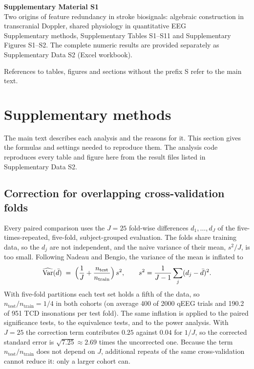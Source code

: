 \documentclass[10pt,a4paper]{article}
\begin{document}
\begin{center}
{\large\bfseries Supplementary Material S1}\\[6pt]
{\normalsize Two origins of feature redundancy in stroke biosignals: algebraic
construction in transcranial Doppler, shared physiology in quantitative EEG}\\[8pt]
{\small Supplementary methods, Supplementary Tables S1--S11 and Supplementary
Figures S1--S2. The complete numeric results are provided separately as
Supplementary Data S2 (Excel workbook).}
\end{center}

\noindent References to tables, figures and sections without the prefix S refer
to the main text.

\tableofcontents

\section{Supplementary methods}

The main text describes each analysis and the reasons for it. This section
gives the formulas and settings needed to reproduce them. The analysis code
reproduces every table and figure here from the result files listed in
Supplementary Data S2.

\subsection{Correction for overlapping cross-validation folds}
\label{sec:s-nb}

Every paired comparison uses the $J = 25$ fold-wise differences
$d_1,\dots,d_J$ of the five-times-repeated, five-fold, subject-grouped
evaluation. The folds share training data, so the $d_j$ are not independent,
and the naive variance of their mean, $s^2/J$, is too small. Following Nadeau
and Bengio, the variance of the mean is inflated to
\begin{equation}
\widehat{\operatorname{Var}}(\bar d) \;=\;
\Bigl(\frac{1}{J} + \frac{n_{\mathrm{test}}}{n_{\mathrm{train}}}\Bigr)\, s^2 ,
\qquad s^2 = \frac{1}{J-1}\sum_{j}(d_j-\bar d)^2 .
\label{eq:nb}
\end{equation}
With five-fold partitions each test set holds a fifth of the data, so
$n_{\mathrm{test}}/n_{\mathrm{train}} = 1/4$ in both cohorts (on average 400 of
2000 qEEG trials and 190.2 of 951 TCD insonations per test fold). The same
inflation is applied to the paired significance tests, to the equivalence
tests, and to the power analysis. With $J = 25$ the correction term contributes
$0.25$ against $0.04$ for $1/J$, so the corrected standard error is
$\sqrt{7.25} \approx 2.69$ times the uncorrected one. Because the term
$n_{\mathrm{test}}/n_{\mathrm{train}}$ does not depend on $J$, additional
repeats of the same cross-validation cannot reduce it: only a larger cohort
can.
\end{document}
